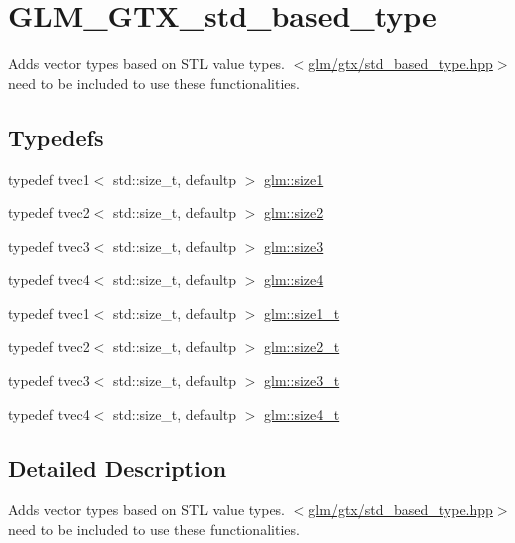 \hypertarget{group__gtx__std__based__type}{}\section{G\+L\+M\+\_\+\+G\+T\+X\+\_\+std\+\_\+based\+\_\+type}
\label{group__gtx__std__based__type}


Adds vector types based on S\+T\+L value types. $<$\hyperlink{std__based__type_8hpp}{glm/gtx/std\+\_\+based\+\_\+type.\+hpp}$>$ need to be included to use these functionalities.  


\subsection*{Typedefs}
\begin{DoxyCompactItemize}
\item 
typedef tvec1$<$ std\+::size\+\_\+t, defaultp $>$ \hyperlink{group__gtx__std__based__type_ga3550330d27cef40f7694130b501be73a}{glm\+::size1}
\item 
typedef tvec2$<$ std\+::size\+\_\+t, defaultp $>$ \hyperlink{group__gtx__std__based__type_gab8b434ee2ba109726915e977c6aca22a}{glm\+::size2}
\item 
typedef tvec3$<$ std\+::size\+\_\+t, defaultp $>$ \hyperlink{group__gtx__std__based__type_gacf3e47fc09ad812f100e13442919fc79}{glm\+::size3}
\item 
typedef tvec4$<$ std\+::size\+\_\+t, defaultp $>$ \hyperlink{group__gtx__std__based__type_ga66a39603f01a37444de3adb28c021e79}{glm\+::size4}
\item 
typedef tvec1$<$ std\+::size\+\_\+t, defaultp $>$ \hyperlink{group__gtx__std__based__type_ga9a9525491009d0df7bcc964b1e2e5745}{glm\+::size1\+\_\+t}
\item 
typedef tvec2$<$ std\+::size\+\_\+t, defaultp $>$ \hyperlink{group__gtx__std__based__type_ga47b1e2bca519b02eb8500a240216b5de}{glm\+::size2\+\_\+t}
\item 
typedef tvec3$<$ std\+::size\+\_\+t, defaultp $>$ \hyperlink{group__gtx__std__based__type_ga689991bc66c16637f043ade5cbb87260}{glm\+::size3\+\_\+t}
\item 
typedef tvec4$<$ std\+::size\+\_\+t, defaultp $>$ \hyperlink{group__gtx__std__based__type_gaa4f69cfac1c3e014a50fd090974092ec}{glm\+::size4\+\_\+t}
\end{DoxyCompactItemize}


\subsection{Detailed Description}
Adds vector types based on S\+T\+L value types. $<$\hyperlink{std__based__type_8hpp}{glm/gtx/std\+\_\+based\+\_\+type.\+hpp}$>$ need to be included to use these functionalities. 



